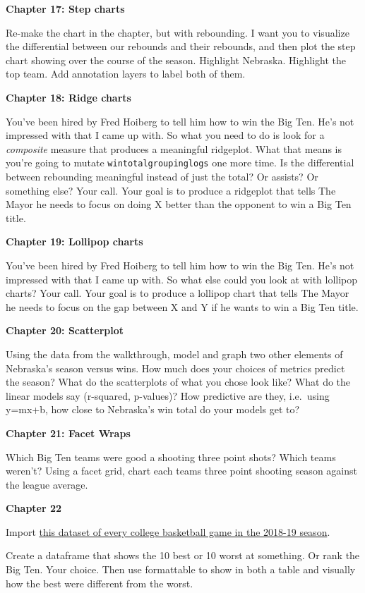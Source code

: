 \documentclass[]{book}
\begin{document}
\textbf{Chapter 17: Step charts}

Re-make the chart in the chapter, but with rebounding. I want you to visualize the differential between our rebounds and their rebounds, and then plot the step chart showing over the course of the season. Highlight Nebraska. Highlight the top team. Add annotation layers to label both of them.

\textbf{Chapter 18: Ridge charts}

You've been hired by Fred Hoiberg to tell him how to win the Big Ten. He's not impressed with that I came up with. So what you need to do is look for a \emph{composite} measure that produces a meaningful ridgeplot. What that means is you're going to mutate \texttt{wintotalgroupinglogs} one more time. Is the differential between rebounding meaningful instead of just the total? Or assists? Or something else? Your call. Your goal is to produce a ridgeplot that tells The Mayor he needs to focus on doing X better than the opponent to win a Big Ten title.

\textbf{Chapter 19: Lollipop charts}

You've been hired by Fred Hoiberg to tell him how to win the Big Ten. He's not impressed with that I came up with. So what else could you look at with lollipop charts? Your call. Your goal is to produce a lollipop chart that tells The Mayor he needs to focus on the gap between X and Y if he wants to win a Big Ten title.

\textbf{Chapter 20: Scatterplot}

Using the data from the walkthrough, model and graph two other elements of Nebraska's season versus wins. How much does your choices of metrics predict the season? What do the scatterplots of what you chose look like? What do the linear models say (r-squared, p-values)? How predictive are they, i.e.~using y=mx+b, how close to Nebraska's win total do your models get to?

\textbf{Chapter 21: Facet Wraps}

Which Big Ten teams were good a shooting three point shots? Which teams weren't? Using a facet grid, chart each teams three point shooting season against the league average.

\textbf{Chapter 22}

Import \href{https://unl.box.com/s/a8m91bro10t89watsyo13yjegb1fy009}{this dataset of every college basketball game in the 2018-19 season}.

Create a dataframe that shows the 10 best or 10 worst at something. Or rank the Big Ten. Your choice. Then use formattable to show in both a table and visually how the best were different from the worst.
\end{document}
